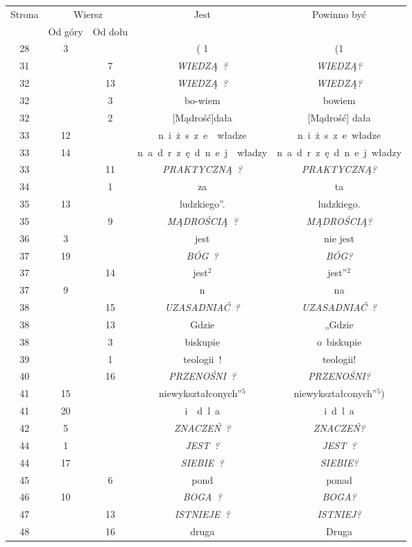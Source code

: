 \documentclass[a4paper,11pt]{article}
\numberwithin{equation}{section}
\begin{document}
\begin{center}

  \begin{tabular}{|c|c|c|c|c|}
    \hline
    Strona & \multicolumn{2}{c|}{Wiersz} & Jest
    & Powinno być \\ \cline{2-3}
    & Od góry & Od dołu & & \\
    \hline
    28 & \hphantom{0}3 & & ( 1 & (1 \\
    31 & & \hphantom{0}7 & \textit{WIEDZĄ~?} & \textit{WIEDZĄ?} \\
    32 & & 13 & \textit{WIEDZĄ~?} & \textit{WIEDZĄ?} \\
    32 & & \hphantom{0}3 & bo-wiem & bowiem \\
    32 & & \hphantom{0}2 & [Mądrość]dała & [Mądrość] dała \\
    33 & 12 & & n~i~ż~s~z~e~~władze & n~i~ż~s~z~e\, władze \\
    33 & 14 & & n~a~d~r~z~ę~d~n~e~j~~władzy
           & n~a~d~r~z~ę~d~n~e~j\, władzy \\
    33 & & 11 & \textit{PRAKTYCZNĄ~?} & \textit{PRAKTYCZNĄ?} \\
    34 & & \hphantom{0}1 & za & ta \\
    35 & 13 & & ludzkiego”. & ludzkiego. \\
    35 & & \hphantom{0}9 & \textit{MĄDROŚCIĄ~?} & \textit{MĄDROŚCIĄ?} \\
    36 & \hphantom{0}3 & & jest & nie jest \\
    37 & 19 & & \textit{BÓG~?} & \textit{BÓG?} \\
    37 & & 14 & jest$^{ 2 }$ & jest''$^{ 2 }$ \\
    37 & \hphantom{0}9 & & n & na \\
    38 & & 15 & \textit{UZASADNIAĆ~?} & \textit{UZASADNIAĆ~?} \\
    38 & & 13 & Gdzie & „Gdzie \\
    38 & & \hphantom{0}3 & biskupie & o~biskupie \\
    39 & & \hphantom{0}1 & teologii~! & teologii! \\
    40 & & 16 & \textit{PRZENOŚNI~?} & \textit{PRZENOŚNI?} \\
    41 & 15 & & niewykształconych”$^{ 5 }$
           & niewykształconych”$^{ 5 }$) \\
    41 & 20 & & i~~d~l~a & i{}\, d~l~a \\
    42 & \hphantom{0}5 & & \textit{ZNACZEŃ~?} & \textit{ZNACZEŃ?} \\
    44 & \hphantom{0}1 & & \textit{JEST~?} & \textit{JEST~?} \\
    44 & 17 & & \textit{SIEBIE~?} & \textit{SIEBIE?} \\
    45 & & \hphantom{0}6 & pond & ponad \\
    46 & 10 & & \textit{BOGA~?} & \textit{BOGA?} \\
    47 & & 13 & \textit{ISTNIEJE~?} & \textit{ISTNIEJ?} \\
    48 & & 16 & druga & Druga \\
    \hline
  \end{tabular}






\end{center}
\end{document}
